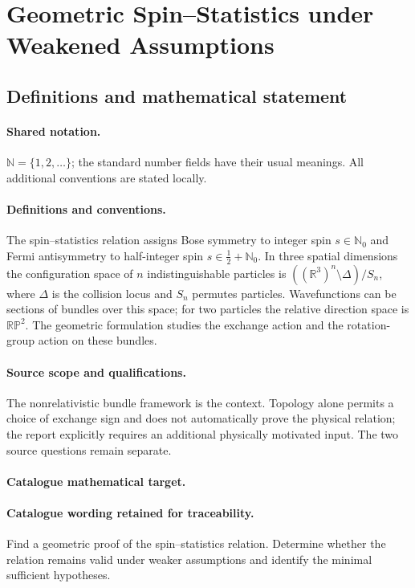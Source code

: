 \documentclass[11pt]{article}
\begin{document}
\section{Geometric Spin–Statistics under Weakened Assumptions}\label{statement}

\subsection{Definitions and mathematical statement}

\paragraph{Shared notation.}$\mathbb N=\{1,2,\ldots\}$; the standard number fields have their usual meanings. All additional conventions are stated locally.


\paragraph{Definitions and conventions.} The spin--statistics relation assigns Bose symmetry to integer spin $s\in\mathbb N_0$ and Fermi antisymmetry to half-integer spin $s\in\tfrac12+\mathbb N_0$. In three spatial dimensions the configuration space of $n$ indistinguishable particles is $((\mathbb R^3)^n\setminus\Delta)/S_n$, where $\Delta$ is the collision locus and $S_n$ permutes particles. Wavefunctions can be sections of bundles over this space; for two particles the relative direction space is $\mathbb{RP}^2$. The geometric formulation studies the exchange action and the rotation-group action on these bundles.

\paragraph{Source scope and qualifications.} The nonrelativistic bundle framework is the context. Topology alone permits a choice of exchange sign and does not automatically prove the physical relation; the report explicitly requires an additional physically motivated input. The two source questions remain separate.

\paragraph{Catalogue mathematical target.}
\paragraph{Catalogue wording retained for traceability.}
Find a geometric proof of the spin–statistics relation. Determine whether the relation remains valid under weaker assumptions and identify the minimal sufficient hypotheses.
\end{document}

